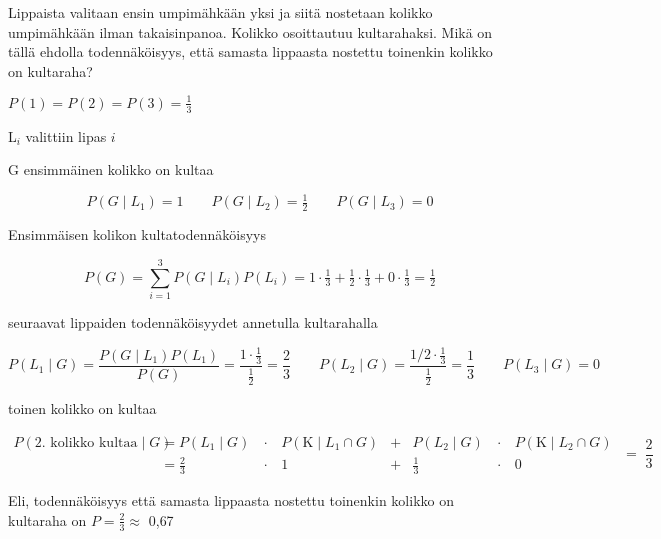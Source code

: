 \documentclass[12pt,a4paper]{article}
\begin{document}
Lippaista valitaan ensin umpimähkään yksi ja siitä nostetaan
kolikko umpimähkään ilman takaisinpanoa. Kolikko osoittautuu
kultarahaksi. Mikä on tällä ehdolla todennäköisyys, että samasta lippaasta
nostettu toinenkin kolikko on kultaraha?
\vspace{0.4cm}

$P(1)=P(2)=P(3)=\tfrac13$
\begin{kuvaus}
  \item[L\(_i\)] valittiin lipas \(i\)
  \item[G] ensimmäinen kolikko on kultaa
\end{kuvaus}




\[
P(G\mid L_1)=1\qquad
P(G\mid L_2)=\tfrac12\qquad
P(G\mid L_3)=0
\]
\begin{alakohta}
\item Ensimmäisen kolikon kultatodennäköisyys

\[
P(G)=\sum_{i=1}^{3}P(G\mid L_i)P(L_i)
     =1\cdot\tfrac13+\tfrac12\cdot\tfrac13+0\cdot\tfrac13
     =\tfrac12
\]

\item seuraavat lippaiden todennäköisyydet annetulla kultarahalla

\[
P(L_1\mid G)=\frac{P(G\mid L_1)P(L_1)}{P(G)}
            =\frac{1\cdot\tfrac13}{\tfrac12}=\frac23\qquad
P(L_2\mid G)=\frac{1/2\cdot\tfrac13}{\tfrac12}=\frac13\qquad
P(L_3\mid G)=0
\]

\item toinen kolikko on kultaa



\[
\begin{aligned}
P(\text{2.\ kolikko kultaa}\mid G)
 &= P(L_1\mid G)\,&\cdot&\,P(\text{K}\mid L_1\cap G) &+& P(L_2\mid G)\,&\cdot&\,P(\text{K}\mid L_2\cap G) \\[4pt]
 &= \frac23          &\cdot&\,1 &+& \frac13        &\cdot&\,0
\end{aligned}
\;=\;
\frac23
\]

\vspace{0.4cm}
Eli, todennäköisyys että samasta lippaasta nostettu toinenkin kolikko on kultaraha on
$P= \frac{2}{3}\approx$ 0{,}67

\end{alakohta}
\end{document}
